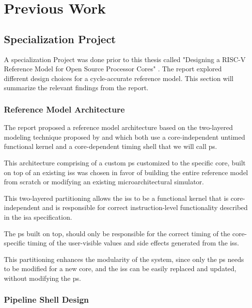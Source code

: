 \chapter{Previous Work}

\section{Specialization Project}
\label{sec:specialization}

A specialization Project was done prior to this thesis called "Designing a RISC-V Reference Model for Open Source Processor Cores" \cite{torjenygaardeikenesDesigningRISCVReference2023}. The report explored different design choices for a cycle-accurate reference model. This section will summarize the relevant findings from the report.




\subsection{Reference Model Architecture}

The report proposed a reference model architecture based on the two-layered modeling technique proposed by \textcite{chiangEfficientTwolayeredCycleaccurate2009} and \textcite{leeFaCSimFastCycleAccurate2008} which both use a core-independent untimed functional kernel and a core-dependent timing shell that we will call \gls{ps}.

This architecture comprising of a custom \gls{ps} customized to the specific core, built on top of an existing \acrshort{iss} was chosen in favor of building the entire reference model from scratch or modifying an existing microarchitectural simulator. 

This two-layered partitioning allows the \acrshort{iss} to be a functional kernel that is core-independent and is responsible for correct instruction-level functionality described in the \acrshort{isa} specification. 

The \gls{ps} built on top, should only be responsible for the correct timing of the core-specific timing of the user-visible values and side effects generated from the \acrshort{iss}. 

This partitioning enhances the modularity of the system, since only the \gls{ps} needs to be modified for a new core, and the \acrshort{iss} can be easily replaced and updated, without modifying the \gls{ps}. 


\subsection{Pipeline Shell Design}

